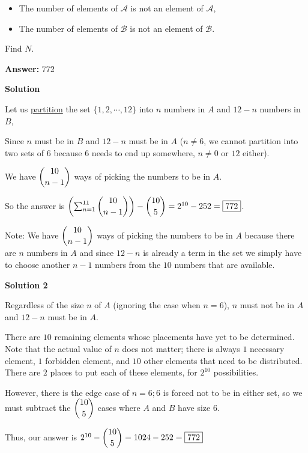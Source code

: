 \begin{enumerate}
\begin{itemize}
        \item  The number of elements of $\mathcal{A}$ is not an element of $\mathcal{A}$,

        \item  The number of elements of $\mathcal{B}$ is not an element of $\mathcal{B}$.

            \end{itemize}
            Find $N$.


 
 \textbf{Answer: }772



\textbf{Solution}

Let us \href{https://artofproblemsolving.com/wiki/index.php?title=Partition}{partition} the set $\{1,2,\cdots,12\}$ into $n$ numbers in $A$ and $12-n$ numbers in $B$, 

 Since $n$ must be in $B$ and $12-n$ must be in $A$ ($n\ne6$, we cannot partition into two sets of 6 because $6$ needs to end up somewhere, $n\ne 0$ or $12$ either).

 We have $\dbinom{10}{n-1}$  ways of picking the numbers to be in $A$. 

 So the answer is $\left(\sum_{n=1}^{11} \dbinom{10}{n-1}\right) - \dbinom{10}{5}=2^{10}-252= \boxed{772}$.

 Note: We have $\dbinom{10}{n-1}$  ways of picking the numbers to be in $A$ because there are $n$ numbers in $A$ and since $12-n$ is already a term in the set we simply have to choose another $n-1$ numbers from the $10$ numbers that are available.

 



\textbf{Solution 2}

Regardless of the size $n$ of $A$ (ignoring the case when $n = 6$), $n$ must not be in $A$ and $12 - n$ must be in $A$. 

 There are $10$ remaining elements whose placements have yet to be determined. Note that the actual value of $n$ does not matter; there is always $1$ necessary element, $1$ forbidden element, and $10$ other elements that need to be distributed. There are $2$ places to put each of these elements, for $2^{10}$ possibilities.

 However, there is the edge case of $n = 6; 6$ is forced not to be in either set, so we must subtract the $\dbinom{10}{5}$ cases where $A$ and $B$ have size $6$.

 Thus, our answer is $2^{10} - \dbinom{10}{5} = 1024 - 252 = \boxed{772}$





\end{enumerate}
